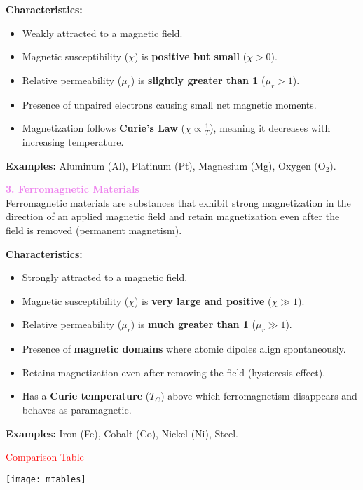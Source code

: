 \documentclass{beamer}
\begin{document}
\begin{frame}

\textbf{Characteristics:}
\begin{itemize}
    \item Weakly attracted to a magnetic field.
    \item Magnetic susceptibility ($\chi$) is \textbf{positive but small} ($\chi > 0$).
    \item Relative permeability ($\mu_r$) is \textbf{slightly greater than 1} ($\mu_r > 1$).
    \item Presence of unpaired electrons causing small net magnetic moments.
    \item Magnetization follows \textbf{Curie's Law} ($\chi \propto \frac{1}{T}$), meaning it decreases with increasing temperature.
\end{itemize}

\textbf{Examples:} Aluminum (Al), Platinum (Pt), Magnesium (Mg), Oxygen (O$_2$).

\textcolor{violet}{\textbf{3. Ferromagnetic Materials}}\\
Ferromagnetic materials are substances that exhibit strong magnetization in the direction of an applied magnetic field and retain magnetization even after the field is removed (permanent magnetism).

\textbf{Characteristics:}
\begin{itemize}
    \item Strongly attracted to a magnetic field.
    \item Magnetic susceptibility ($\chi$) is \textbf{very large and positive} ($\chi \gg 1$).
    \item Relative permeability ($\mu_r$) is \textbf{much greater than 1} ($\mu_r \gg 1$).
    \item Presence of \textbf{magnetic domains} where atomic dipoles align spontaneously.
    \end{itemize}
\end{frame}



\begin{frame}

\begin{itemize}

\item Retains magnetization even after removing the field (hysteresis effect).
    \item Has a \textbf{Curie temperature} ($T_C$) above which ferromagnetism disappears and behaves as paramagnetic.
\end{itemize}

\textbf{Examples:} Iron (Fe), Cobalt (Co), Nickel (Ni), Steel.

\textcolor{red}{Comparison Table}
\begin{center}
\texttt{[image: mtables]}
\end{center}

\end{frame}
\end{document}
